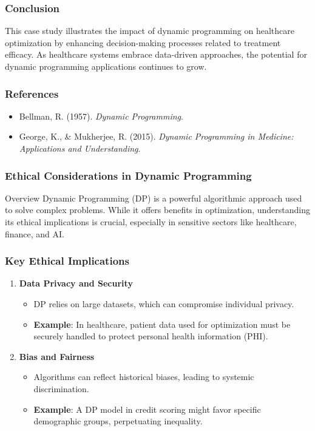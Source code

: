 \documentclass[aspectratio=169]{beamer}
\begin{document}
\begin{frame}[fragile]
    \frametitle{Conclusion}
    This case study illustrates the impact of dynamic programming on healthcare optimization by enhancing decision-making processes related to treatment efficacy.
    As healthcare systems embrace data-driven approaches, the potential for dynamic programming applications continues to grow.
\end{frame}

\begin{frame}[fragile]
    \frametitle{References}
    \begin{itemize}
        \item Bellman, R. (1957). \textit{Dynamic Programming}.
        \item George, K., \& Mukherjee, R. (2015). \textit{Dynamic Programming in Medicine: Applications and Understanding}.
    \end{itemize}
\end{frame}

\begin{frame}[fragile]
  \frametitle{Ethical Considerations in Dynamic Programming}
  
  \begin{block}{Overview}
    Dynamic Programming (DP) is a powerful algorithmic approach used to solve complex problems. While it offers benefits in optimization, understanding its ethical implications is crucial, especially in sensitive sectors like healthcare, finance, and AI.
  \end{block}
\end{frame}

\begin{frame}[fragile]
  \frametitle{Key Ethical Implications}
  
  \begin{enumerate}
    \item \textbf{Data Privacy and Security}
    \begin{itemize}
      \item DP relies on large datasets, which can compromise individual privacy.
      \item \textbf{Example}: In healthcare, patient data used for optimization must be securely handled to protect personal health information (PHI).
    \end{itemize}
    
    \item \textbf{Bias and Fairness}
    \begin{itemize}
      \item Algorithms can reflect historical biases, leading to systemic discrimination.
      \item \textbf{Example}: A DP model in credit scoring might favor specific demographic groups, perpetuating inequality.
    \end{itemize}
  \end{enumerate}
\end{frame}
\end{document}
